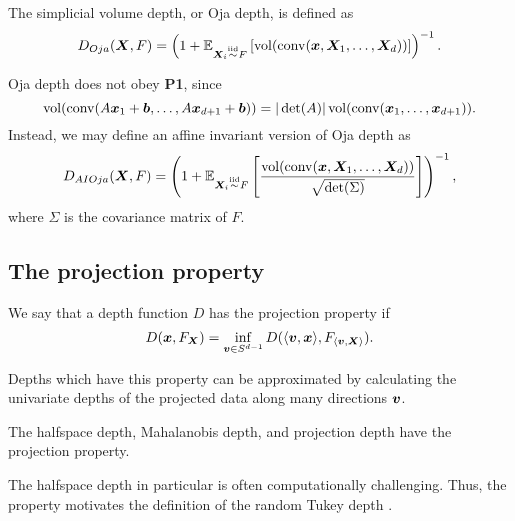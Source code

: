 \begin{definition}
    The simplicial volume depth, or Oja depth, is defined as
    \begin{equation}
        D_{Oja}(\bm{X}, F) = \left(1 + \operatorname{\mathbb{E}}_{\bm{X}_i \overset{\text{iid}}{\sim} F}\left[\operatorname{vol}(\operatorname{conv}(\bm{x}, \bm{X}_1, \dots, \bm{X}_d))\right]\right)^{-1}.
    \end{equation}
\end{definition}

\begin{remark}
    Oja depth does not obey \textbf{P1}, since
    \begin{equation}
        \operatorname{vol}(\operatorname{conv}(A\bm{x}_1 + \bm{b}, \dots, A\bm{x}_{d + 1} + \bm{b})) = |\det(A)| \operatorname{vol}(\operatorname{conv}(\bm{x}_1, \dots, \bm{x}_{d + 1})).
    \end{equation}
    Instead, we may define an affine invariant version of Oja depth as
    \begin{equation}
        D_{AIOja}(\bm{X}, F) = \left(1 + \operatorname{\mathbb{E}}_{\bm{X}_i \overset{\text{iid}}{\sim} F}\left[\frac{\operatorname{vol}(\operatorname{conv}(\bm{x}, \bm{X}_1, \dots, \bm{X}_d))}{\sqrt{\det(\Sigma)}}\right]\right)^{-1},
    \end{equation}
    where $\Sigma$ is the covariance matrix of $F$.
\end{remark}


\subsection{The projection property}


\begin{definition}
    We say that a depth function $D$ has the projection property if
    \begin{equation}
        D(\bm{x}, F_{\bm{X}}) = \inf_{\bm{v} \in S^{d - 1}} D(\langle \bm{v}, \bm{x} \rangle, F_{\langle \bm{v}, \bm{X} \rangle}).
    \end{equation}
\end{definition}

Depths which have this property can be approximated by calculating the
univariate depths of the projected data along many directions $\bm{v}$.

\begin{lemma}
    The halfspace depth, Mahalanobis depth, and projection depth have the
    projection property.
\end{lemma}

The halfspace depth in particular is often computationally challenging.
Thus, the property motivates the definition of the random Tukey depth
\parencite{albertos-reyes-2008a}.

